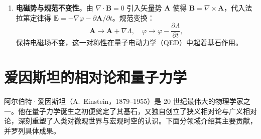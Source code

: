 \documentclass{ctexart} %
\begin{document}
\begin{enumerate}
    \begin{align}
        D_{1n} - D_{2n} &= \sigma_f, & B_{1n} - B_{2n} &= 0,\\
        E_{1t} - E_{2t} &= 0,      & H_{1t} - H_{2t} &= K_f.
        \label{eq:bc}
    \end{align}
    这些条件在电磁波反射与折射、波导和谐振腔分析中至关重要\cite{griffiths2017}。
    \item \textbf{电磁势与规范不变性}。由 $\nabla \cdot \mathbf{B} = 0$ 引入矢量势 $\mathbf{A}$ 使得 $\mathbf{B} = \nabla \times \mathbf{A}$，代入法拉第定律得 $\mathbf{E} = -\nabla\varphi - \partial\mathbf{A}/\partial t$。规范变换：
    \begin{equation}
        \mathbf{A} \to \mathbf{A} + \nabla\Lambda,\quad \varphi \to \varphi - \frac{\partial\Lambda}{\partial t},
        \label{eq:gauge}
    \end{equation}
    保持电磁场不变，这一对称性在量子电动力学（QED）中起着基石作用。
\end{enumerate}

\section{爱因斯坦的相对论和量子力学}

阿尔伯特·爱因斯坦（A.~Einstein，1879--1955）是 20 世纪最伟大的物理学家之一。他在量子力学诞生之初便奠定了其基石，又独自创立了狭义相对论与广义相对论，深刻重塑了人类对微观世界与宏观时空的认识。下面分领域介绍其主要贡献，并罗列具体成果。
\end{document}
